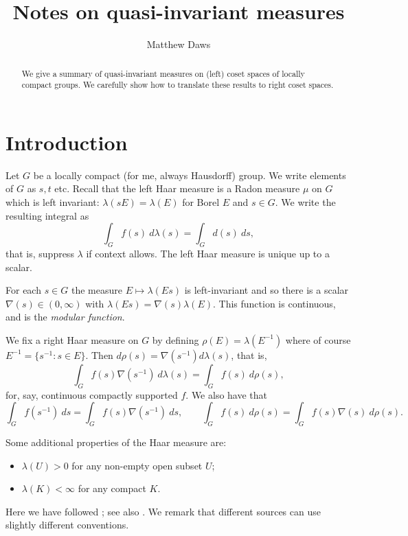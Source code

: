 \documentclass[11pt,a4paper]{article}
\theoremstyle{definition}
\begin{document}
\title{Notes on quasi-invariant measures}
\author{Matthew Daws}
\maketitle

\begin{abstract}
We give a summary of quasi-invariant measures on (left) coset spaces of locally compact
groups.  We carefully show how to translate these results to right coset spaces.
\end{abstract}

\section{Introduction}

Let $G$ be a locally compact (for me, always Hausdorff) group.
We write elements of $G$ as $s,t$ etc.  Recall that the left
Haar measure is a Radon measure $\mu$ on $G$ which is left invariant: $\lambda(sE) = \lambda(E)$
for Borel $E$ and $s\in G$.  We write the resulting integral as
\[ \int_G f(s) \ d\lambda(s) = \int_G d(s) \ ds, \]
that is, suppress $\lambda$ if context allows.  The left Haar measure is unique up to a scalar.

For each $s\in G$ the measure $E\mapsto \lambda(Es)$ is left-invariant and so there is a scalar
$\nabla(s)\in (0,\infty)$ with $\lambda(Es) = \nabla(s) \lambda(E)$.  This function is continuous,
and is the \emph{modular function}.

We fix a right Haar measure on $G$ by defining $\rho(E) = \lambda(E^{-1})$ where of course
$E^{-1} = \{s^{-1}:s\in E\}$.  Then $d\rho(s) = \nabla(s^{-1}) d\lambda(s)$, that is,
\[ \int_G f(s) \nabla(s^{-1}) \ d\lambda(s) = \int_G f(s) \ d\rho(s), \]
for, say, continuous compactly supported $f$.  We also have that
\[ \int_G f(s^{-1}) \ ds = \int_G f(s) \nabla(s^{-1}) \ ds, \qquad
\int_G f(s) \ d\rho(s) = \int_G f(s) \nabla(s) \ d\rho(s). \]

Some additional properties of the Haar measure are:
\begin{itemize}
\item $\lambda(U)>0$ for any non-empty open subset $U$;
\item $\lambda(K)<\infty$ for any compact $K$.
\end{itemize}


Here we have followed \cite{fol}; see also \cite{hr}.
We remark that different sources can use slightly different conventions.
\end{document}
